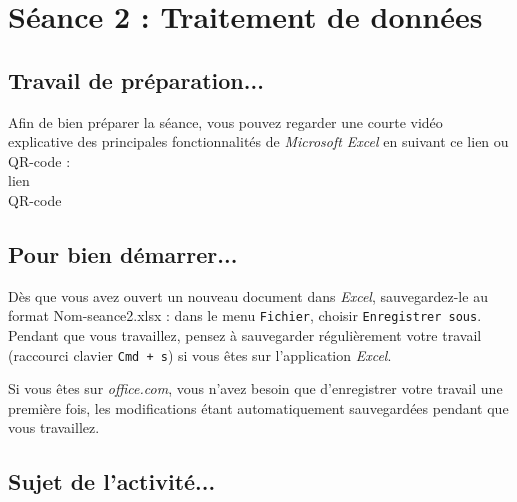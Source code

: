 \vfill








%
%
%
%


\pagebreak

\section{Séance 2 : Traitement de données}\label{ficheTableur4e2}

\subsection{Travail de préparation...}

Afin de bien préparer la séance, vous pouvez regarder une courte vidéo explicative des principales fonctionnalités de \emph{Microsoft Excel} en suivant ce lien ou QR-code :\\

lien\\
QR-code

\subsection{Pour bien démarrer...}

Dès que vous avez ouvert un nouveau document dans \emph{Excel}, sauvegardez-le au format Nom-seance2.xlsx : dans le menu \texttt{Fichier}, choisir \texttt{Enregistrer sous}. Pendant que vous travaillez, pensez à sauvegarder régulièrement votre travail (raccourci clavier \texttt{Cmd + s}) si vous êtes sur l'application \emph{Excel}.


Si vous êtes sur \emph{office.com}, vous n'avez besoin que d'enregistrer votre travail une première fois, les modifications étant automatiquement sauvegardées pendant que vous travaillez.


\subsection{Sujet de l'activité...}

